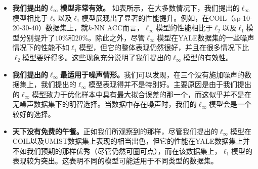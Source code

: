 \begin{itemize}
    \item \textbf{我们提出的$\ell_{\infty}$模型非常有效。} 如表所示，在大多数情况下，我们提出的$\ell_{\infty}$模型相比于$\ell_{2}$以及$\ell_{1}$模型展现出了显著的性能提升。例如，在COIL（sp-10-20-30-40）数据集上，就$k$-NN ACC而言，$\ell_{\infty}$模型的性能相比于$\ell_{2}$以及$\ell_{1}$模型分别提升了$10\%$和$20\%$。除此之外，尽管$\ell_{\infty}$模型在YALE数据集的一些噪声情况下的性能不如$\ell_{1}$模型，但它的整体表现仍然很好，并且在很多情况下比$\ell_{2}$模型要好得多。这些现象充分说明了我们提出的$\ell_{\infty}$模型的有效性。
    \item \textbf{我们提出的$\ell_{\infty}$最适用于噪声情形。}我们可以发现，在三个没有施加噪声的数据集上，我们提出的$\ell_{\infty}$模型表现得并不是特别好。主要原因是由于我们提出的$\ell_{\infty}$模型致力于优化样本中具有最大拟合误差的那一个，而这似乎并不是在无噪声数据集下的明智选择。当数据中存在噪声时，我们的$\ell_{\infty}$模型会是一个较好的选择。
    \item \textbf{天下没有免费的午餐。}正如我们所观察到的那样，尽管我们提出的$\ell_{\infty}$模型在COIL以及UMIST数据集上表现的相当出色，但它的性能在YALE数据集上并不如我们预期的那样优秀（尽管仍然可圈可点），而在该数据集上，$\ell_{1}$模型的表现较为突出。这表明不同的模型可能适用于不同类型的数据集。
\end{itemize}

